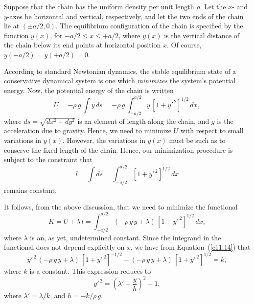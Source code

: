 Suppose that the chain has the uniform density per unit length $\rho$. 
Let the $x$- and $y$-axes be horizontal and vertical, respectively, and
let the two ends of the chain lie at $(\pm a/2, 0)$. The equilibrium configuration of the chain is specified by the function $y(x)$, for $-a/2\leq x \leq +a/2$, where
$y(x)$ is the vertical distance of the chain below its end points at horizontal
position $x$. Of course, $y(-a/2) = y(+a/2) = 0$. 

According to standard Newtonian dynamics, the stable equilibrium
state of a conservative dynamical system is one which {\em minimizes}\/
the system's potential energy. Now, the potential energy of the chain
is written
\begin{equation}
U = - \rho\,g\,\int y\,ds = - \rho\,g\,\int_{-a/2}^{a/2} y\,[1+y'^{\,2}]^{1/2}\,dx,
\end{equation}
where $ds = \sqrt{dx^2+dy^2}$ is an element of length along the chain, and
$g$ is the acceleration due to gravity.
Hence, we need to minimize $U$ with respect to small variations in $y(x)$. 
However, the variations in $y(x)$ must be such as to conserve the
fixed length of the chain. Hence, our minimization procedure is subject to
the constraint that
\begin{equation}\label{e11.21}
l = \int ds = \int_{-a/2}^{a/2}[1+y'^{\,2}]^{1/2}\,dx
\end{equation} 
remains constant.

It follows, from the above discussion, that we need to minimize the
functional
\begin{equation}
K = U + \lambda\,l = \int_{-a/2}^{a/2}(-\rho\,g\,y+\lambda)\,[1+y'^{\,2}]^{1/2}\,dx,
\end{equation}
where $\lambda$ is an, as yet, undetermined constant. Since the integrand
in the functional does not depend explicitly on $x$, we have
from Equation~(\ref{e11.14}) that
\begin{equation}
y'^{\,2}\,(-\rho\,g\,y+\lambda)\,[1+y'^{\,2}]^{-1/2} - (-\rho\,g\,y+\lambda)\,[1+y'^{\,2}]^{1/2} = k,
\end{equation}
where $k$ is a constant. This expression reduces to
\begin{equation}\label{e11.24}
y'^{\,2} = \left(\lambda' + \frac{y}{h}\right)^2 - 1,
\end{equation}
where $\lambda' = \lambda/k$, and $h=-k/\rho\,g$. 

